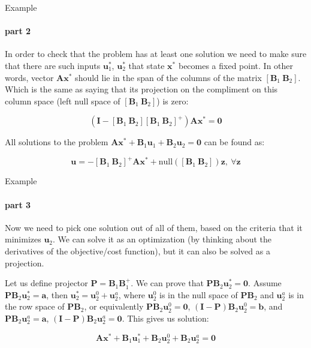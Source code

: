 \documentclass{beamer}
\begin{document}
\begin{frame}{Example}
\framesubtitle{part 2}
\begin{flushleft}

In order to check that the problem has at least one solution we need to make sure that there are such inputs $\mathbf{u}^*_1$, $\mathbf{u}^*_2$ that state $\mathbf{x}^*$ becomes a fixed point. In other words, vector $\mathbf{A}\mathbf{x}^*$ should lie in the span of the columns of the matrix $[\mathbf{B}_1 \ \mathbf{B}_2]$. Which is the same as saying that its projection on the compliment on this column space (left null space of $[\mathbf{B}_1 \ \mathbf{B}_2]$) is zero:

\begin{equation}
    (\mathbf{I} - [\mathbf{B}_1 \ \mathbf{B}_2] [\mathbf{B}_1 \ \mathbf{B}_2]^+) \mathbf{A}\mathbf{x}^* = \mathbf{0}
\end{equation}

All solutions to the problem $\mathbf{A} \mathbf{x}^* + \mathbf{B}_1 \mathbf{u}_1 + \mathbf{B}_2 \mathbf{u}_2 = \mathbf{0}$ can be found as:

\begin{equation}
    \mathbf{u} = - [\mathbf{B}_1 \ \mathbf{B}_2]^+ \mathbf{A}\mathbf{x}^* + \text{null}([\mathbf{B}_1 \ \mathbf{B}_2])\mathbf{z}, \ \forall \mathbf{z}
\end{equation}

\end{flushleft}
\end{frame}



\begin{frame}{Example}
\framesubtitle{part 3}
\begin{flushleft}

Now we need to pick one solution out of all of them, based on the criteria that it minimizes $\mathbf{u}_2$. We can solve it as an optimization (by thinking about the derivatives of the objective/cost function), but it can also be solved as a projection.

\bigskip

Let us define projector $\mathbf{P} = \mathbf{B}_1 \mathbf{B}^+_1$. We can prove that $\mathbf{P} \mathbf{B}_2 \mathbf{u}^*_2 = \mathbf{0}$. Assume $\mathbf{P} \mathbf{B}_2 \mathbf{u}^*_2 = \mathbf{a}$, then $\mathbf{u}^*_2 =  \mathbf{u}^0_2 + \mathbf{u}^a_2$, where $\mathbf{u}^0_2$ is in the null space of $\mathbf{P} \mathbf{B}_2$ and $\mathbf{u}^a_2$ is in the row space of $\mathbf{P} \mathbf{B}_2$, or equivalently $\mathbf{P} \mathbf{B}_2 \mathbf{u}^0_2 = \mathbf{0}$, $(\mathbf{I} - \mathbf{P}) \mathbf{B}_2 \mathbf{u}^0_2 = \mathbf{b}$, and $\mathbf{P} \mathbf{B}_2 \mathbf{u}^a_2 = \mathbf{a}$, $(\mathbf{I} - \mathbf{P}) \mathbf{B}_2 \mathbf{u}^a_2 = \mathbf{0}$. This gives us solution:

\begin{equation}
    \mathbf{A} \mathbf{x}^* + \mathbf{B}_1 \mathbf{u}^*_1 + \mathbf{B}_2 \mathbf{u}^0_2 + \mathbf{B}_2 \mathbf{u}^a_2 = \mathbf{0}
\end{equation}

\end{flushleft}
\end{frame}
\end{document}
